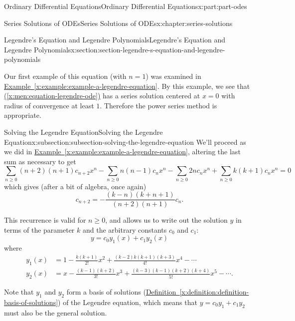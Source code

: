 \documentclass[oneside,10pt,]{book}
\newcommand{\xreffont}{\relax}
\numberwithin{equation}{part}
\newcommand{\amp}{&}
\begin{document}
\begin{partptx}{Ordinary Differential Equations}{}{Ordinary Differential Equations}{}{}{x:part:part-odes}
\begin{chapterptx}{Series Solutions of ODEs}{}{Series Solutions of ODEs}{}{}{x:chapter:series-solutions}
\begin{sectionptx}{Legendre's Equation and Legendre Polynomials}{}{Legendre's Equation and Legendre Polynomials}{}{}{x:section:section-legendre-s-equation-and-legendre-polynomials}
\begin{introduction}{}
Our first example of this equation (with \(n = 1\)) was examined in \hyperref[x:example:example-a-legendre-equation]{Example~{\xreffont\ref{x:example:example-a-legendre-equation}}}. By this example, we see that \hyperref[x:men:equation-legendre-ode]{({\xreffont\ref{x:men:equation-legendre-ode}})} has a series solution centered at \(x = 0\) with radius of convergence at least \(1\). Therefore the power series method is appropriate.%
\end{introduction}%
%
%
\typeout{************************************************}
\typeout{************************************************}
%
\begin{subsectionptx}{Solving the Legendre Equation}{}{Solving the Legendre Equation}{}{}{x:subsection:subsection-solving-the-legendre-equation}
We'll proceed as we did in \hyperref[x:example:example-a-legendre-equation]{Example~{\xreffont\ref{x:example:example-a-legendre-equation}}}, altering the last sum as necessary to get%
\begin{equation*}
\sum_{n\geq0}(n+2)(n+1)c_{n+2}x^{n} - \sum_{n\geq0}n(n-1)c_{n}x^{n} - \sum_{n\geq0}2nc_{n}x^{n} + \sum_{n\geq0}k(k+1)c_{n}x^{n} = 0
\end{equation*}
which gives (after a bit of algebra, once again)%
\begin{equation*}
c_{n+2} = -\frac{(k - n)(k + n + 1)}{(n + 2)(n + 1)}c_{n}\text{.}
\end{equation*}
%
\par
This recurrence is valid for \(n \geq 0\), and allows us to write out the solution \(y\) in terms of the parameter \(k\) and the arbitrary constants \(c_{0}\) and \(c_{1}\):%
\begin{equation*}
y = c_{0}y_{1}(x) + c_{1}y_{2}(x)
\end{equation*}
where%
\begin{align}
y_{1}(x) \amp = 1 - \frac{k(k+1)}{2!}x^{2} + \frac{(k - 2)k(k+1)(k + 3)}{4!}x^{4} - \cdots\label{x:mrow:equation-legendre-soln-y1}\\
y_{2}(x) \amp = x - \frac{(k-1)(k+2)}{3!}x^{3} + \frac{(k-3)(k-1)(k+2)(k+4)}{5!}x^{5} - \cdots \text{.}\label{x:mrow:equation-legendre-soln-y2}
\end{align}
%
\par
Note that \(y_{1}\) and \(y_{2}\) form a basis of solutions (\hyperref[x:definition:definition-basis-of-solutions]{Definition~{\xreffont\ref{x:definition:definition-basis-of-solutions}}}) of the Legendre equation, which means that \(y = c_{0}y_{1} + c_{1}y_{2}\) must also be the general solution.%

\end{subsectionptx}
\end{sectionptx}
\end{chapterptx}
\end{partptx}
\end{document}
